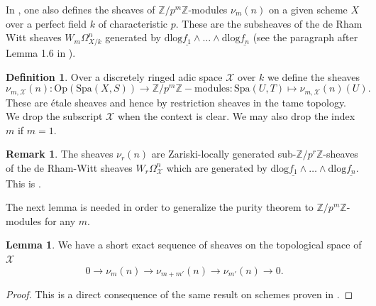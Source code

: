 \documentclass{amsart}
\def\Spa{\textrm{Spa}}
\def\Op{\textrm{Op}}
\theoremstyle{definition}
\newtheorem{definition}[theorem]{Definition}
\newtheorem{lemma}[theorem]{Lemma}
\newtheorem{remark}[theorem]{Remark}
\newcommand\dlog{\mathrm{dlog}}
\newcommand{\mX}{\mathcal{X}}
\numberwithin{equation}{section}
\begin{document}
In \cite{MilneValuesOfZeta}, one also defines the sheaves of $\mathbb{Z}/p^{m}\mathbb{Z}$-modules $\nu_{m}(n)$ on a given scheme $X$ over a perfect field $k$ of characteristic $p$. These are the subsheaves of the de Rham Witt sheaves $W_m\Omega^n_{X/k}$ generated by $\dlog \underline{f_1 }\wedge \dots \wedge \dlog \underline{f_n}$ (see the paragraph after Lemma 1.6 in \cite{MilneValuesOfZeta}).
\begin{definition}
	Over a discretely ringed adic space $\mathcal{X}$ over $k$ we define the sheaves
	\[
	\nu_{m,\mX}(n):\Op(\Spa(X,S))\to \mathbb{Z}/p^m\mathbb{Z}-\textrm{modules}: \Spa(U,T)\mapsto \nu_{m,\mX}(n)(U).
	\]
	These are \'etale sheaves and hence by restriction sheaves in the tame topology. We drop the subscript $\mX$ when the context is clear. We may also drop the index $m$ if $m=1$.
\end{definition}
\begin{remark}
	The sheaves $\nu_{r}(n)$ are Zariski-locally generated sub-$\mathbb{Z}/p^r\mathbb{Z}$-sheaves of the de Rham-Witt sheaves $W_r\Omega_\mX^n$ which are generated by $\dlog \underline{f_1} \wedge \dots \wedge \dlog \underline{f_n}$. This is \cite[Theorem 1.2]{morrowLogHodgeWitt}  .
\end{remark}
The next lemma is needed in order to generalize the purity theorem to $\mathbb{Z}/p^m\mathbb{Z}$-modules for any $m$.
\begin{lemma}\label{highermSES}
	We have a short exact sequence of sheaves on the topological space of $\mathcal{X}$
	\[
	0\to \nu_{m}(n)\to \nu_{m+m'}(n)\to \nu_{m'}(n)\to 0.
	\]
\end{lemma}
\begin{proof}
	This is a direct consequence of the same result on schemes proven in \cite[Lemma 1.7]{MilneValuesOfZeta}.
\end{proof}
\end{document}
